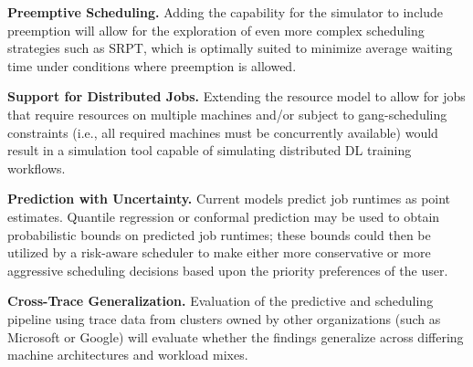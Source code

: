 \textbf{Preemptive Scheduling.} Adding the capability for the simulator to include preemption will allow for the exploration of even more complex scheduling strategies such as SRPT, which is optimally suited to minimize average waiting time under conditions where preemption is allowed.

\textbf{Support for Distributed Jobs.} Extending the resource model to allow for jobs that require resources on multiple machines and/or subject to gang-scheduling constraints (i.e., all required machines must be concurrently available) would result in a simulation tool capable of simulating distributed DL training workflows.

\textbf{Prediction with Uncertainty.} Current models predict job runtimes as point estimates. Quantile regression or conformal prediction may be used to obtain probabilistic bounds on predicted job runtimes; these bounds could then be utilized by a risk-aware scheduler to make either more conservative or more aggressive scheduling decisions based upon the priority preferences of the user.

\textbf{Cross-Trace Generalization.} Evaluation of the predictive and scheduling pipeline using trace data from clusters owned by other organizations (such as Microsoft or Google) will evaluate whether the findings generalize across differing machine architectures and workload mixes.